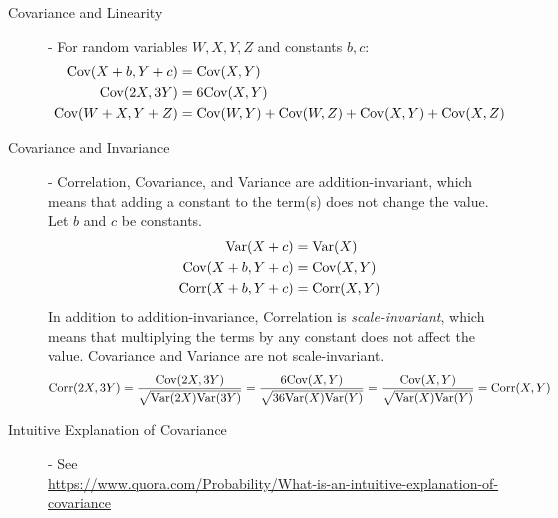 \documentclass[11pt]{article}
\begin{document}
\begin{description}
\item [Covariance and Linearity] - For random variables $W, X, Y, Z$ and constants $b, c$:
  \begin{align*}
    \textrm{Cov}(X + b, Y + c) &= \textrm{Cov}(X, Y) \\
    \textrm{Cov}(2X, 3Y) &= 6\textrm{Cov}(X, Y) \\
    \textrm{Cov}(W + X, Y + Z) &= \textrm{Cov}(W, Y) + \textrm{Cov}(W, Z) + \textrm{Cov}(X, Y) + \textrm{Cov}(X, Z)
  \end{align*}
\item [Covariance and Invariance] - Correlation, Covariance, and Variance are addition-invariant, which means that adding a constant to the term(s) does not change the value. Let $b$ and $c$ be constants.
  \begin{align*}
    \textrm{Var}(X + c) &= \textrm{Var}(X) \\
    \textrm{Cov}(X + b, Y + c) &= \textrm{Cov}(X, Y) \\
    \textrm{Corr}(X + b, Y + c) &= \textrm{Corr}(X, Y)
  \end{align*}
  In addition to addition-invariance, Correlation is \emph{scale-invariant}, which means that multiplying the terms by any constant does not affect the value. Covariance and Variance are not scale-invariant.
  \[\textrm{Corr}(2X, 3Y) = \frac{\textrm{Cov}(2X, 3Y)}{\sqrt{\textrm{Var}(2X)\textrm{Var}(3Y)}} = \frac{6\textrm{Cov}(X, Y)}{\sqrt{36\textrm{Var}(X)\textrm{Var}(Y)}} = \frac{\textrm{Cov}(X, Y)}{\sqrt{\textrm{Var}(X)\textrm{Var}(Y)}} = \textrm{Corr}(X, Y)\]
\item[Intuitive Explanation of Covariance] - See \\
\url{https://www.quora.com/Probability/What-is-an-intuitive-explanation-of-covariance}
\end{description}
\end{document}
